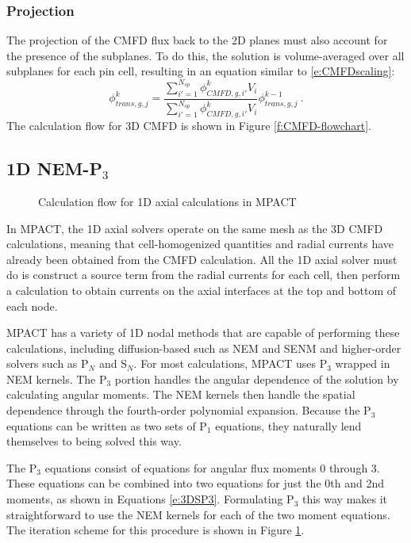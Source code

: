 \subsubsection{Projection}\label{sss:cmfdProj}

The projection of the CMFD flux back to the 2D planes must also account for the presence of the subplanes.  To do this, the solution is volume-averaged over all subplanes for each pin cell, resulting in an equation similar to \ref{e:CMFDscaling}:
\begin{equation}
\phi_{trans,g,j}^k = \frac{\sum_{i'=1}^{N_{sp}} \phi_{CMFD,g,i'}^k V_i}{\sum_{i'=1}^{N_{sp}} \phi_{CMFD,g,i'}^k V_i} \phi_{trans,g,j}^{k-1}\ .
\end{equation}
The calculation flow for 3D CMFD is shown in Figure \ref{f:CMFD-flowchart}.

\subsection{1D NEM-P\texorpdfstring{$_3$}{3}}

\begin{figure}[H]
  \centering
  
  \caption{Calculation flow for 1D axial calculations in MPACT}\label{f:Axial-flowchart}
\end{figure}

In MPACT, the 1D axial solvers operate on the same mesh as the 3D CMFD calculations, meaning that cell-homogenized quantities and radial currents have already been obtained from the CMFD calculation.  All the 1D axial solver must do is construct a source term from the radial currents for each cell, then perform a calculation to obtain currents on the axial interfaces at the top and bottom of each node.

MPACT has a variety of 1D nodal methods that are capable of performing these calculations, including diffusion-based such as NEM and SENM and higher-order solvers such as P$_N$ and S$_N$.  For most calculations, MPACT uses P$_3$ wrapped in NEM kernels.  The P$_3$ portion handles the angular dependence of the solution by calculating angular moments.  The NEM kernels then handle the spatial dependence through the fourth-order polynomial expansion.  Because the P$_3$ equations can be written as two sets of P$_1$ equations, they naturally lend themselves to being solved this way.

The P$_3$ equations consist of equations for angular flux moments 0 through 3.  These equations can be combined into two equations for just the 0th and 2nd moments, as shown in Equations \ref{e:3DSP3}.  Formulating P$_3$ this way makes it straightforward to use the NEM kernels for each of the two moment equations.  The iteration scheme for this procedure is shown in Figure \ref{f:Axial-flowchart}.

